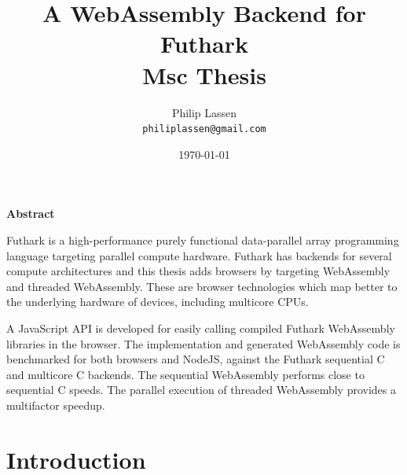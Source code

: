 \documentclass[11pt]{book}
\title{
  \vspace{3cm}
  \Huge{A WebAssembly Backend for Futhark} \\
  \Large{Msc Thesis}
}
\author{
  \Large{Philip Lassen}
  \\ \texttt{philiplassen@gmail.com} \\
}
\date{
    \today
}
\def \ColourPDF {include/natbio-farve}
\def \TitlePDF   {include/nat-en}  %
\begin{document}


\clearpage\maketitle
\thispagestyle{empty}
\setcounter{page}{0}
\newpage
{}
\begin{center}
    \textbf{Abstract}
\end{center}

Futhark is a high-performance purely functional data-parallel array programming language targeting parallel compute hardware. Futhark has backends for several  compute architectures  and this thesis adds browsers by targeting WebAssembly and threaded WebAssembly. These are browser technologies which map better to the underlying hardware of devices, including multicore CPUs. 

A JavaScript API is developed for easily calling compiled Futhark WebAssembly libraries in the browser. 
The implementation and generated WebAssembly code is benchmarked for both browsers and NodeJS, against the Futhark sequential C and multicore C backends. The sequential WebAssembly performs close to sequential C speeds. The parallel execution of threaded WebAssembly provides a multifactor speedup.




\tableofcontents



\chapter{Introduction}
\end{document}

